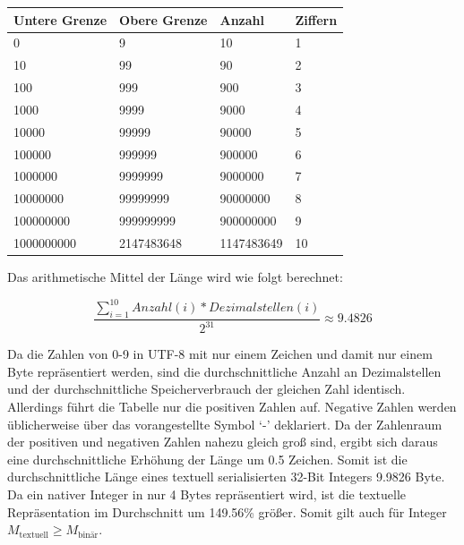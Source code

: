 \documentclass[ngerman]{seminarvorlage}
\begin{document}
\begin{table}[h]
  \centering
  \begin{tabular}{|l|l|l|l|} 
  \hline
  \textbf{Untere Grenze} & \textbf{Obere Grenze} & \textbf{Anzahl} & \textbf{Ziffern}         \\ 
  \hline
  0                      & 9                     & 10              & 1                        \\
  10                     & 99                    & 90              & 2                        \\
  100                    & 999                   & 900             & 3                        \\
  1000                   & 9999                  & 9000            & 4                        \\
  10000                  & 99999                 & 90000           & 5                        \\
  100000                 & 999999                & 900000          & 6                        \\
  1000000                & 9999999               & 9000000         & 7                        \\
  10000000               & 99999999              & 90000000        & 8                        \\
  100000000              & 999999999             & 900000000       & 9                        \\
  1000000000             & 2147483648            & 1147483649      & 10                       \\
  \hline
  \end{tabular}
\end{table}

Das arithmetische Mittel der Länge wird wie folgt berechnet:

$$\frac{\sum_{i=1}^{10} Anzahl(i) * Dezimalstellen(i)}{2^{31}} \approx 9.4826$$

Da die Zahlen von 0-9 in UTF-8 mit nur einem Zeichen und damit nur einem Byte repräsentiert werden, sind die durchschnittliche Anzahl an Dezimalstellen und der durchschnittliche Speicherverbrauch der gleichen Zahl identisch. Allerdings führt die Tabelle nur die positiven Zahlen auf. Negative Zahlen werden üblicherweise über das vorangestellte Symbol `-' deklariert. Da der Zahlenraum der positiven und negativen Zahlen nahezu gleich groß sind, ergibt sich daraus eine durchschnittliche Erhöhung der Länge um 0.5 Zeichen. Somit ist die durchschnittliche Länge eines textuell serialisierten 32-Bit Integers 9.9826 Byte. Da ein nativer Integer in nur 4 Bytes repräsentiert wird, ist die textuelle Repräsentation im Durchschnitt um 149.56\% größer. Somit gilt auch für Integer $ M_{\text{textuell}} \geq M_{\text{binär}} $.
\end{document}
